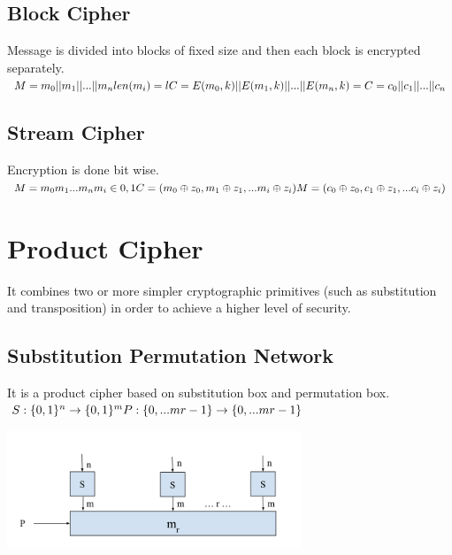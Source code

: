 \documentclass[11pt]{article}
\begin{document}
\subsection*{Block Cipher}
Message is divided into blocks of fixed size and then each block is encrypted separately. \\ 
$
M = m_0 || m_1 || ... || m_n \\
len(m_i) = l \\ 
C = E(m_0,k) || E(m_1,k) || ... || E(m_n,k) = C = c_0 || c_1 || ... || c_n 
$

\subsection*{Stream Cipher}
Encryption is done bit wise. \\ 
$
M = m_0m_1...m_n \\
m_i \in {0,1} \\ 
C = (m_0 \oplus z_0,m_1 \oplus z_1, ... m_i \oplus z_i) \\
M = (c_0 \oplus z_0,c_1 \oplus z_1, ... c_i \oplus z_i)  \\
$

\section*{Product Cipher}
It combines two or more simpler cryptographic primitives (such as substitution and transposition) in order to achieve a higher level of security. 

\subsection*{Substitution Permutation Network}
It is a product cipher based on substitution box and permutation box.\\
$
S : \{0,1\} ^n \rightarrow \{0,1\} ^m \\
P : \{0,... mr-1\} \rightarrow \{0,... mr-1\}
$
\begin{center}
\includegraphics[width=250pt]{p2.png}
\end{center}
\end{document}
